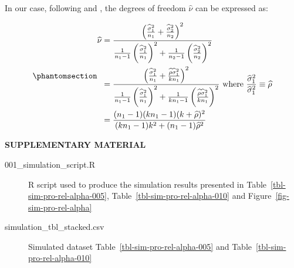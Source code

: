 \documentclass[
  12pt]{article}
\begin{document}
In our case, following \citet{satterthwaite_approximate_1946} and
\citet{welch_generalization_1947}, the degrees of freedom
\(\widehat{\nu}\) can be expressed as:

\begin{equation}\phantomsection\label{eq-df-ws}{\begin{split}
  \widehat{\nu} & = \frac{\left( \frac{\widehat{\sigma}^2_1}{n_1} + \frac{\widehat{\sigma}^2_2}{n_2} \right)^2}{\frac{1}{n_1-1} \left( \frac{\widehat{\sigma}^2_1}{n_1} \right)^2 + \frac{1}{n_2-1} \left( \frac{\widehat{\sigma}^2_2}{n_2} \right)^2} \\
  & = \frac{\left( \frac{\widehat{\sigma}^2_1}{n_1} + \frac{\widehat{\rho}\widehat{\sigma}^2_1}{kn_1} \right)^2}{\frac{1}{n_1-1} \left( \frac{\widehat{\sigma}^2_1}{n_1} \right)^2 + \frac{1}{kn_1-1} \left( \frac{\widehat{\rho}\widehat{\sigma}^2_1}{kn_1} \right)^2} \text{ where } \frac{\widehat{\sigma}^2_1}{\widehat{\sigma}^2_1} \equiv \widehat{\rho} \\
  & = \frac{(n_1-1)(kn_1-1)(k+\widehat{\rho})^2}{(kn_1-1)k^2 + (n_1-1)\widehat{\rho}^2}
  \end{split}}\end{equation}

\label{supplementary-material}
\bigskip

\begin{center}

{\large\bf SUPPLEMENTARY MATERIAL}

\end{center}

\begin{description}
\item[001\_simulation\_script.R]
R script used to produce the simulation results presented in
Table~\ref{tbl-sim-pro-rel-alpha-005},
Table~\ref{tbl-sim-pro-rel-alpha-010} and
Figure~\ref{fig-sim-pro-rel-alpha}
\item[simulation\_tbl\_stacked.csv]
Simulated dataset Table~\ref{tbl-sim-pro-rel-alpha-005} and
Table~\ref{tbl-sim-pro-rel-alpha-010}
\end{description}


\renewcommand\refname{References}
  
\end{document}
